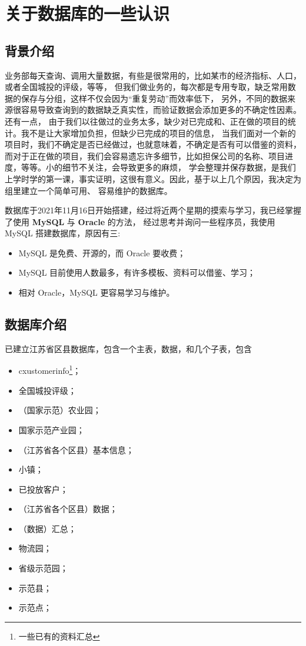\documentclass[H:\workspace\实习日志\ShixiRizhi.tex]{subfiles}
\begin{document}
\section{关于数据库的一些认识}\label{appendix:b}
\subsection{背景介绍}
业务部每天查询、调用大量数据，有些是很常用的，比如某市的经济指标、人口，或者全国城投的评级，等等，
但我们做业务的，每次都是专用专取，缺乏常用数据的保存与分组，这样不仅会因为“重复劳动”而效率低下，
另外，不同的数据来源很容易导致查询到的数据缺乏真实性，而验证数据会添加更多的不确定性因素。还有一点，
由于我们以往做过的业务太多，缺少对已完成和、正在做的项目的统计。我不是让大家增加负担，但缺少已完成的项目的信息，
当我们面对一个新的项目时，我们不确定是否已经做过，也就意味着，不确定是否有可以借鉴的资料，
而对于正在做的项目，我们会容易遗忘许多细节，比如担保公司的名称、项目进度，等等。小的细节不关注，会导致更多的麻烦，
学会整理并保存数据，是我们上学时学的第一课，事实证明，这很有意义。因此，基于以上几个原因，我决定为组里建立一个简单可用、
容易维护的数据库。\par 
数据库于2021年11月16日开始搭建，经过将近两个星期的摸索与学习，我已经掌握了使用 \textbf{MySQL} 与 \textbf{Oracle} 的方法，
经过思考并询问一些程序员，我使用 MySQL 搭建数据库，原因有三: 
\begin{itemize}
    \item MySQL 是免费、开源的，而 Oracle 要收费；
    \item MySQL 目前使用人数最多，有许多模板、资料可以借鉴、学习；
    \item 相对 Oracle，MySQL 更容易学习与维护。
\end{itemize} 

\subsection{数据库介绍}
已建立江苏省区县数据库，包含一个主表，数据，和几个子表，包含
\begin{itemize}
    \item cxustomerinfo\footnote{一些已有的资料汇总}；
    \item 全国城投评级；
    \item （国家示范）农业园；
    \item 国家示范产业园；
    \item （江苏省各个区县）基本信息；
    \item 小镇；
    \item 已投放客户；
    \item （江苏省各个区县）数据；
    \item （数据）汇总；
    \item 物流园；
    \item 省级示范园；
    \item 示范县；
    \item 示范点；
\end{itemize}
\end{document}
